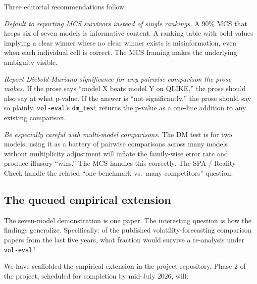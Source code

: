 Three editorial recommendations follow.

\textit{Default to reporting MCS survivors instead of single rankings.} A 90\% MCS that keeps six of seven models is informative content. A ranking table with bold values implying a clear winner where no clear winner exists is misinformation, even when each individual cell is correct. The MCS framing makes the underlying ambiguity visible.

\textit{Report Diebold-Mariano significance for any pairwise comparison the prose makes.} If the prose says ``model X beats model Y on QLIKE,'' the prose should also say at what p-value. If the answer is ``not significantly,'' the prose should say so plainly. \texttt{vol-eval}'s \texttt{dm\_test} returns the p-value as a one-line addition to any existing comparison.

\textit{Be especially careful with multi-model comparisons.} The DM test is for two models; using it as a battery of pairwise comparisons across many models without multiplicity adjustment will inflate the family-wise error rate and produce illusory ``wins.'' The MCS handles this correctly. The SPA / Reality Check handle the related ``one benchmark vs.\ many competitors'' question.

\subsection{The queued empirical extension}

The seven-model demonstration is one paper. The interesting question is how the findings generalize. Specifically: of the published volatility-forecasting comparison papers from the last five years, what fraction would survive a re-analysis under \texttt{vol-eval}?

We have scaffolded the empirical extension in the project repository. Phase 2 of the project, scheduled for completion by mid-July 2026, will:

